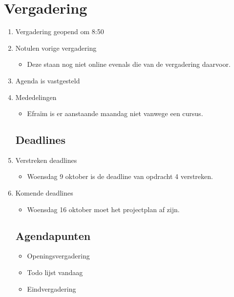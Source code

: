 \documentclass{article}
\begin{document}
\section*{Vergadering}
\begin{enumerate}
	
	\subsection*{Vooraf}
	\item Vergadering geopend om 8:50 %
	\item Notulen vorige vergadering
	\begin{itemize}
		\item Deze staan nog niet online evenals die van de vergadering daarvoor.
	\end{itemize}
	\item Agenda is vastgesteld
	\item Mededelingen
	\begin{itemize}
		\item Efraïm is er aanstaande maandag niet vanwege een cursus.
	\end{itemize}

	\subsection*{Deadlines}
	\item Verstreken deadlines
	\begin{itemize}
		\item Woensdag 9 oktober is de deadline van opdracht 4 verstreken.
	\end{itemize}
	\item Komende deadlines
	\begin{itemize}
		\item Woensdag 16 oktober moet het projectplan af zijn.
	\end{itemize}

	\subsection*{Agendapunten}
		\begin{itemize}
		\item Openingsvergadering
		\item Todo lijst vandaag
		\item Eindvergadering
	\end{itemize}


\end{enumerate}
\end{document}

